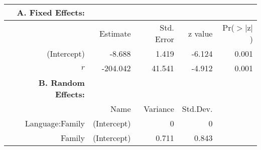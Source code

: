 \begin{tabular}{rrrrr}
 {\bf A. Fixed Effects:} \\
\hline
 & Estimate & Std. Error & z value & Pr($>$$|$z$|$) \\ 
  \hline
(Intercept) & -8.688 & 1.419 & -6.124 & 0.001 \\ 
  $r$ & -204.042 & 41.541 & -4.912 & 0.001 \\ 

\hline \hline
{\bf B. Random Effects:} \\
\hline
& Name & Variance & Std.Dev. \\
\hline
Language:Family & (Intercept) & 0 & 0 \\
Family & (Intercept) & 0.711 & 0.843 \\
\end{tabular}

